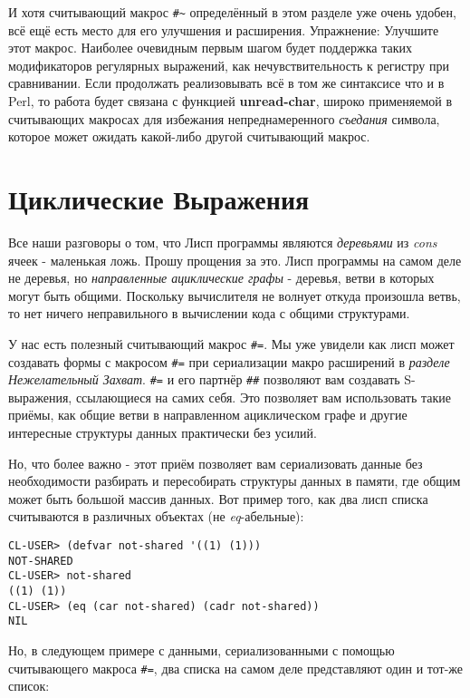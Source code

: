 И хотя считывающий макрос \verb"#~" определённый в этом разделе уже очень удобен, всё ещё есть место для его улучшения и расширения. Упражнение: Улучшите этот макрос. Наиболее очевидным первым шагом будет поддержка таких модификаторов регулярных выражений, как нечувствительность к регистру при сравнивании. Если продолжать реализовывать всё в том же синтаксисе что и в Perl, то работа будет связана с функцией \textbf{unread-char}, широко применяемой в считывающих макросах для избежания непреднамеренного \emph{съедания} символа, которое может ожидать какой-либо другой считывающий макрос.

\section{Циклические Выражения}\label{section_cyclic_expressions}

Все наши разговоры о том, что Лисп программы являются \emph{деревьями} из \emph{cons} ячеек - маленькая ложь. Прошу прощения за это. Лисп программы на самом деле не деревья, но \emph{направленные ациклические графы} - деревья, ветви в которых могут быть общими. Поскольку вычислителя не волнует откуда произошла ветвь, то нет ничего неправильного в вычислении кода с общими структурами.

У нас есть полезный считывающий макрос \verb"#=". Мы уже увидели как лисп может создавать формы с макросом \verb"#=" при сериализации макро расширений в \emph{разделе Нежелательный Захват}. \verb"#=" и его партнёр \verb"##" позволяют вам создавать S-выражения, ссылающиеся на самих себя. Это позволяет вам использовать такие приёмы, как общие ветви в направленном ациклическом графе и другие интересные структуры данных практически без усилий.

Но, что более важно - этот приём позволяет вам сериализовать данные без необходимости разбирать и пересобирать структуры данных в памяти, где общим может быть большой массив данных. Вот пример того, как два лисп списка считываются в различных объектах (не \emph{eq}-а\-бель\-ные):

\begin{verbatim}
CL-USER> (defvar not-shared '((1) (1)))
NOT-SHARED
CL-USER> not-shared
((1) (1))
CL-USER> (eq (car not-shared) (cadr not-shared))
NIL
\end{verbatim}

Но, в следующем примере с данными, сериализованными с помощью считывающего макроса \verb"#=", два списка на самом деле представляют один и тот-же список:

